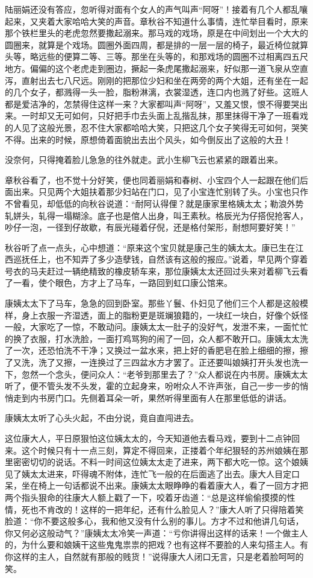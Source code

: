 \documentclass[12pt,UTF8]{ctexbook}
\begin{document}
{{{陆丽娟还没有答应，忽听得对面有个女人的声气叫声“阿呀”！接着有几个人都乱嚷起来，又夹着大家哈哈大笑的声音。章秋谷不知道什么事情，连忙举目看时，原来那个铁栏里头的老虎忽然要撒起溺来。那马戏的戏场，原是在中间划出一个大大的圆圈来，就算是个戏场。圆圈外面四周，都是排的一层一层的椅子，最近椅位就算头等，略远些的便算二等、三等。那坐在头等的，和那戏场的圆圈不过相离四五尺地方。偏偏的这个老虎走到圈边，撅起一条虎尾撒起溺来，好似那一道飞泉从空直泻，直射出去七八尺远。刚刚的把那位少妇和坐在两旁的两个大姐，还有坐在一起的几个女子，都溅得一头一脸，脂粉淋漓，衣裳湿透，连口内也溅了好些。这班人都是爱洁净的，怎禁得住这样一来？大家都叫声“阿呀”，又羞又恨，恨不得要哭出来。一时却又无可如何，只好把手巾去头面上乱揩乱抹，那里抹得干净了一班看戏的人见了这般光景，忍不住大家都哈哈大笑，只把这几个女子笑得无可如何，哭笑不得。出来的时候，原想倚着面貌出去出个风头，如今倒反出了这般的大丑！

没奈何，只得掩着脸儿急急的往外就走。武小生柳飞云也紧紧的跟着出来。

章秋谷看了，也不觉十分好笑，便也同着丽娟和春树、小宝四个人一起跟在他们后面出来。只见两个大姐扶着那少妇站在门口，见了小宝连忙别转了头。小宝也只作不曾看见，却低低的向秋谷说道：“耐阿认得俚？就是康家里格姨太太；勒浪外势轧姘头，轧得一塌糊涂。底子也是倌人出身，叫王素秋。格辰光为仔搭倪抢客人，吵仔一泡，一径到仔故歇，有辰光碰着仔倪，还是格付架形，耐想阿要好笑！”

秋谷听了点一点头，心中想道：“原来这个宝贝就是康己生的姨太太。康已生在江西巡抚任上，也不知弄了多少造孽钱，自然该有这般的报应。”说着，早见两个穿着号衣的马夫赶过一辆绝精致的橡皮轿车来，那位康姨太太还回过头来对着柳飞云看了一看，使个眼色，方才上了马车，一路回到虹口康公馆来。

康姨太太下了马车，急急的回到卧室。那些丫鬟、仆妇见了他们三个人都是这般模样，身上衣服一齐湿透，面上的脂粉更是斑斓狼籍的，一块红一块白，好像个妖怪一般，大家吃了一惊，不敢动问。康姨太太一肚子的没好气，发泄不来，一面忙忙的换了衣服，打水洗脸，一面打鸡骂狗的闹了一回，众人都不敢开口。康姨太太洗了一次，还恐怕洗不干净；又换过一盆水来，把上好的香肥皂在脸上细细的擦，擦了又洗，洗了又擦，一连换过了三四盆水方才罢了。正还要叫娘姨打开头发也洗一下，忽然一个念头，便问众人：“老爷到那里去了？”众人都说在内书房。康姨太太听了，便不管头发不头发，霍的立起身来，吩咐众人不许声张，自己一步一步的悄悄走到内书房门口。先侧着耳朵一听，果然听得里面有人在那里低低的讲话。

康姨太太听了心头火起，不由分说，竟自直闯进去。

这位康大人，平日原狠怕这位姨太太的，今天知道他去看马戏，要到十二点钟回来。这个时候只有十一点三刻，算定不得回来，正搂着个年纪狠轻的苏州娘姨在那里密密切切的说话。不料一时间这位姨太太走了进来，两下都大吃一惊。这个娘姨见了姨太太进来，吓得魂不附体，连忙飞一般的在后面逃了出去。康大人目定口呆，坐在椅上一句话都说不出来。康姨太太眼睁睁的看着康大人，看了一回方才把两个指头狠命的往康大人额上戳了一下，咬着牙齿道：“总是这样偷偷摸摸的性情，死也不肯改的！这样的一把年纪，还有什么脸见人？”康大人听了只得陪着笑脸道：“你不要这般多心，我和他又没有什么别的事儿。方才不过和他讲几句话，你又何必这般动气？”康姨太太冷笑一声道：“亏你讲得出这样的话来！一个做主人的，为什么要和娘姨干这些鬼鬼祟祟的把戏？也有这样不要脸的人来勾搭主人。有你这样的主人，自然就有那般的贱货！”说得康大人闭口无言，只是老着脸呵呵的笑。

}}}
\end{document}
